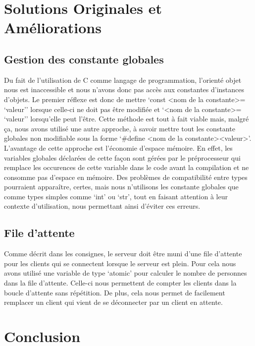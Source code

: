 \documentclass[utf8]{article}
\begin{document}
\section{Solutions Originales et Améliorations}
\subsection{Gestion des constante globales}
Du fait de l'utilisation de C comme langage de programmation, l'orienté objet nous est inaccessible et nous n'avons donc pas accès aux constantes d'instances d'objets. 
Le premier réflexe est donc de mettre `const \textless nom de la constante\textgreater= `valeur'' lorsque celle-ci ne doit pas être modifiée et `\textless nom de la 
constante\textgreater = `valeur'' lorsqu'elle peut l'être. Cette méthode est tout à fait viable mais, malgré ça, nous avons utilisé une autre approche, à savoir mettre tout 
les constante globales non modifiable sous la forme `\#define \textless nom de la constante\textgreater \textless valeur\textgreater'. L'avantage de cette approche est l'économie d'espace mémoire. 
En effet, les variables globales déclarées de cette façon sont gérées par le préprocesseur qui remplace les occurences de cette variable dans le code avant la compilation et ne consomme pas d'espace en mémoire.
Des problèmes de compatibilité entre types pourraient apparaître, certes, mais nous n'utilisons les constante globales que comme types simples comme `int' ou `str', tout en
faisant attention à leur contexte d'utilisation, nous permettant ainsi d'éviter ces erreurs.

\subsection{File d'attente}
Comme décrit dans les consignes, le serveur doit être muni d'une file d'attente pour les clients qui se connectent lorsque le serveur est plein. Pour cela nous avons utilisé une 
variable de type `atomic' pour calculer le nombre de personnes dans la file d'attente. Celle-ci nous permettent de compter les clients dans la boucle d'attente sans répétition.
De plus, cela nous permet de facilement remplacer un client qui vient de se déconnecter par un client en attente.

\section{Conclusion}
\end{document}
